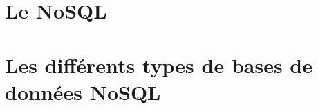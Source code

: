 \documentclass[11pt]{article}
\title{\color{blue}\titre}
\author{\eleves}
\date{\today}
\begin{document}
\maketitle
\thispagestyle{empty}

\section*{Le NoSQL}


\section*{Les différents types de bases de données NoSQL}

\end{document}
